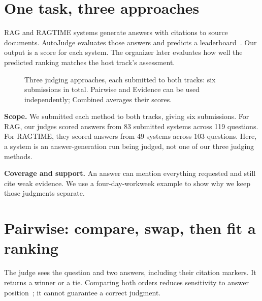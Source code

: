 \documentclass[11pt,letterpaper]{article}
\begin{document}
\section{One task, three approaches}
RAG and RAGTIME systems generate answers with citations to source documents. AutoJudge evaluates those answers and predicts a leaderboard~\cite{autojudge}. Our output is a score for each system. The organizer later evaluates how well the predicted ranking matches the host track's assessment.
\begin{figure}[H]\centering
{}
\caption{Three judging approaches, each submitted to both tracks: six submissions in total. Pairwise and Evidence can be used independently; Combined averages their scores.}
\end{figure}
\textbf{Scope.} We submitted each method to both tracks, giving six submissions. For RAG, our judges scored answers from 83 submitted systems across 119 questions. For RAGTIME, they scored answers from 49 systems across 103 questions. Here, a system is an answer-generation run being judged, not one of our three judging methods.

\textbf{Coverage and support.} An answer can mention everything requested and still cite weak evidence. We use a four-day-workweek example to show why we keep those judgments separate.

\clearpage
\section{Pairwise: compare, swap, then fit a ranking}
The judge sees the question and two answers, including their citation markers. It returns a winner or a tie. Comparing both orders reduces sensitivity to answer position~\cite{wang,zheng}; it cannot guarantee a correct judgment.
\end{document}

